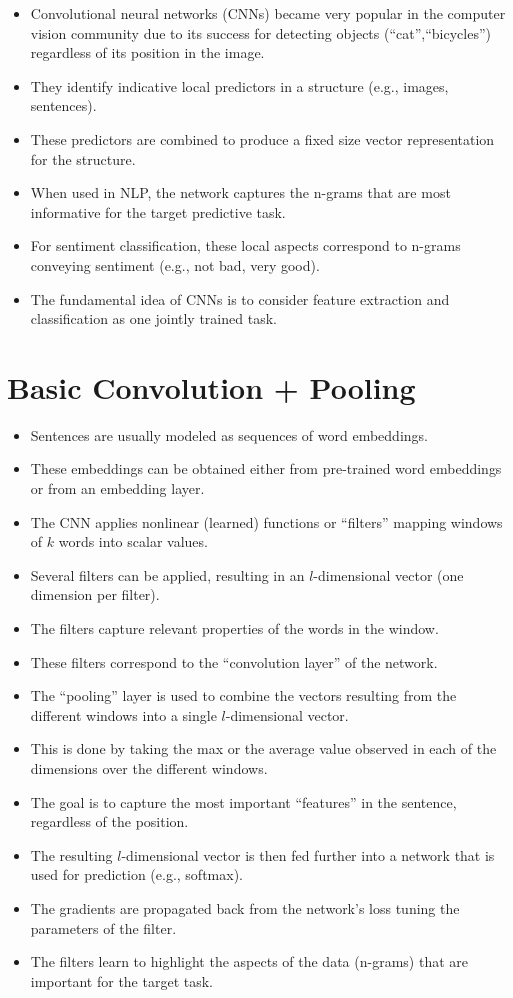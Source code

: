 \begin{itemize}
\item Convolutional neural networks (CNNs) became very popular in the computer vision community due to its success for detecting objects (``cat'',``bicycles'') regardless of its position in the image.
\item They identify indicative local predictors in a structure (e.g., images, sentences).
\item These predictors are combined to produce a fixed size vector representation for the structure.
\item When used in NLP, the network captures the n-grams that are most informative for the target predictive task.
\item For sentiment classification, these local aspects correspond to n-grams conveying sentiment (e.g., not bad, very good).
\item The fundamental idea of CNNs \cite{lecun1998gradient}  is  to  consider  feature extraction and classification as one jointly trained task. 

\end{itemize}


\section{Basic Convolution  + Pooling}
\begin{itemize}
\item Sentences are usually modeled as sequences of word embeddings.
\item These embeddings can be obtained either from pre-trained word embeddings or from an embedding layer.
\item The CNN applies  nonlinear (learned) functions or ``filters'' mapping windows of $k$ words into scalar values.
\item Several filters can be applied, resulting in an $l$-dimensional vector (one dimension per filter).
\item The filters capture relevant properties of the words in the window.
\item These filters correspond to the ``convolution layer'' of the network.
\item The ``pooling'' layer is used
to combine the vectors resulting from the different windows into a single $l$-dimensional vector.
\item This is done by taking the max or the average value observed in each of the dimensions over the different windows.
\item The goal is to capture the most important ``features'' in the sentence, regardless of the position.
\item The resulting $l$-dimensional vector is then fed further into a network that is used for prediction (e.g., softmax).
\item The gradients are propagated back from the network's loss tuning the parameters of the filter.
\item The filters learn to highlight the aspects of the data (n-grams) that are important for the target task. 
\end{itemize}



